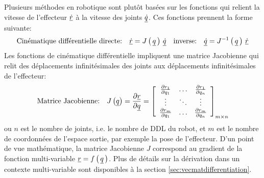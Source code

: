 Plusieurs méthodes en robotique sont plutôt basées sur les fonctions qui relient la vitesse de l'effecteur $\underline{\dot{r}}$ à la vitesse des joints $\underline{\dot{q}}$. Ces fonctions prennent la forme suivante:
\begin{equation}
\text{Cinématique différentielle directe:} \quad \underline{\dot{r}} = J\left( \, \underline{q} \, \right) \, \underline{\dot{q}}   \quad \text{inverse:} \quad \underline{\dot{q}} = J^{-1}\left( \, \underline{q} \, \right) \, \underline{\dot{r}}
\end{equation}
Les fonctions de cinématique différentielle impliquent une matrice Jacobienne qui relit des déplacements infinitésimales des joints aux déplacements infinitésimales de l'effecteur:
\begin{equation}
\text{Matrice Jacobienne:} \quad J\left( \underline{q} \right) = \frac{\partial \underline{r}}{\partial \underline{q}} = 
\left[ \begin{array}{c c c} 
\frac{\partial r_1 }{\partial q_1}   &  \hdots & \frac{\partial r_1 }{\partial q_n} \\ 
\vdots                               &  \ddots & \vdots                             \\
\frac{\partial r_m }{\partial q_1}   &  \hdots & \frac{\partial r_m }{\partial q_n}
\end{array} \right]_{m \times n}
\label{eq:matricejaco}
\end{equation}
ou $n$ est le nombre de joints, i.e. le nombre de DDL du robot, et $m$ est le nombre de coordonnées de l'espace sortie, par exemple la pose de l'effecteur.  D'un point de vue mathématique, la matrice Jacobienne $J$ correspond au gradient de la fonction multi-variable $\underline{r} = f\left( \, \underline{q} \, \right)$. Plus de détails sur la dérivation dans un contexte multi-variable sont disponibles à la section \ref{sec:vecmatdifferentiation}.

